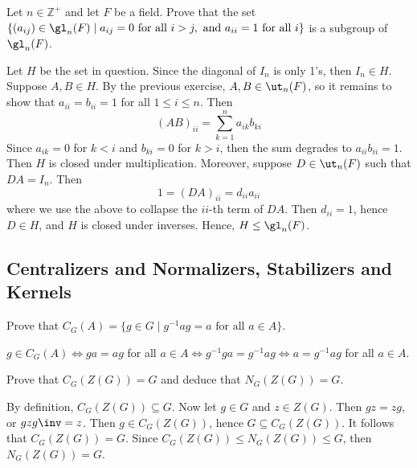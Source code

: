 \begin{exercise} \label{ex2.1.17}
    Let $n \in \mathbb{Z}^+$ and let $F$ be a field. Prove that the set $\{ (a_{ij}) \in \gl_n(F) \mid a_{ij} = 0 \text{ for all } i > j,\ \text{and } a_{ii} = 1 \text{ for all } i \}$ is a subgroup of $\gl_n(F)$.
\end{exercise}

\begin{sol}
    Let $H$ be the set in question. Since the diagonal of $I_n$ is only 1's, then $I_n \in H$. Suppose $A, B \in H$. By the previous exercise, $A, B \in \ut_n(F)$, so it remains to show that $a_{ii} = b_{ii} = 1$ for all $1 \leq i \leq n$. Then
    \[(AB)_{ii} = \sum_{k = 1}^n a_{ik}b_{ki}\]
    Since $a_{ik} = 0$ for $k < i$ and $b_{ki} = 0$ for $k > i$, then the sum degrades to $a_{ii}b_{ii} = 1$. Then $H$ is closed under multiplication. Moreover, suppose $D \in \ut_n(F)$ such that $DA = I_n$. Then
    \[1 = (DA)_{ii} = d_{ii}a_{ii}\]
    where we use the above to collapse the $ii$-th term of $DA$. Then $d_{ii} = 1$, hence $D \in H$, and $H$ is closed under inverses. Hence, $H \leq \gl_n(F)$.
\end{sol}

\newpage

\subsection{Centralizers and Normalizers, Stabilizers and Kernels}

\begin{exercise} \label{ex2.2.1}
    Prove that $C_G(A)=\{g\in G\mid g^{-1}ag=a\text{ for all }a\in A\}.$
\end{exercise}

\begin{sol}
    $g \in C_G(A) \iff ga = ag$ for all $a \in A \iff g^{-1}ga = g^{-1}ag \iff a = g^{-1}ag$ for all $a \in A$.
\end{sol}

\begin{exercise} \label{ex2.2.2}
    Prove that $C_G(Z(G))=G$ and deduce that $N_G(Z(G))=G.$
\end{exercise}

\begin{sol}
    By definition, $C_G(Z(G)) \subseteq G$. Now let $g \in G$ and $z \in Z(G)$. Then $gz = zg$, or $gzg\inv = z$. Then $g \in C_G(Z(G))$, hence $G \subseteq C_G(Z(G))$. It follows that $C_G(Z(G)) = G$. Since $C_G(Z(G)) \leq N_G(Z(G)) \leq G$, then $N_G(Z(G)) = G$.
\end{sol}

